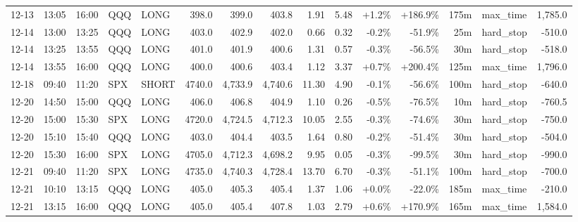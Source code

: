 \documentclass[11pt,a4paper,twoside]{article}
\begin{document}
\begin{landscape}
\begin{center}
\begin{longtable}{>{\color{txtmain}}l l l l l r r r r r r r r >{\color{txtmain}}l r}
12-13 & 13:05 & 16:00 & QQQ & LONG & 398.0 & 399.0 & 403.8 & 1.91 & 5.48 & \textcolor{wingreen}{+1.2\%} & \textcolor{wingreen}{+186.9\%} & 175m & max\_time & \textcolor{wingreen}{1,785.0} \\
12-14 & 13:00 & 13:25 & QQQ & LONG & 403.0 & 402.9 & 402.0 & 0.66 & 0.32 & \textcolor{lossred}{-0.2\%} & \textcolor{lossred}{-51.9\%} & 25m & hard\_stop & \textcolor{lossred}{-510.0} \\
12-14 & 13:25 & 13:55 & QQQ & LONG & 401.0 & 401.9 & 400.6 & 1.31 & 0.57 & \textcolor{lossred}{-0.3\%} & \textcolor{lossred}{-56.5\%} & 30m & hard\_stop & \textcolor{lossred}{-518.0} \\
12-14 & 13:55 & 16:00 & QQQ & LONG & 400.0 & 400.6 & 403.4 & 1.12 & 3.37 & \textcolor{wingreen}{+0.7\%} & \textcolor{wingreen}{+200.4\%} & 125m & max\_time & \textcolor{wingreen}{1,796.0} \\
12-18 & 09:40 & 11:20 & SPX & SHORT & 4740.0 & 4,733.9 & 4,740.6 & 11.30 & 4.90 & \textcolor{lossred}{-0.1\%} & \textcolor{lossred}{-56.6\%} & 100m & hard\_stop & \textcolor{lossred}{-640.0} \\
12-20 & 14:50 & 15:00 & QQQ & LONG & 406.0 & 406.8 & 404.9 & 1.10 & 0.26 & \textcolor{lossred}{-0.5\%} & \textcolor{lossred}{-76.5\%} & 10m & hard\_stop & \textcolor{lossred}{-760.5} \\
12-20 & 15:00 & 15:30 & SPX & LONG & 4720.0 & 4,724.5 & 4,712.3 & 10.05 & 2.55 & \textcolor{lossred}{-0.3\%} & \textcolor{lossred}{-74.6\%} & 30m & hard\_stop & \textcolor{lossred}{-750.0} \\
12-20 & 15:10 & 15:40 & QQQ & LONG & 403.0 & 404.4 & 403.5 & 1.64 & 0.80 & \textcolor{lossred}{-0.2\%} & \textcolor{lossred}{-51.4\%} & 30m & hard\_stop & \textcolor{lossred}{-504.0} \\
12-20 & 15:30 & 16:00 & SPX & LONG & 4705.0 & 4,712.3 & 4,698.2 & 9.95 & 0.05 & \textcolor{lossred}{-0.3\%} & \textcolor{lossred}{-99.5\%} & 30m & hard\_stop & \textcolor{lossred}{-990.0} \\
12-21 & 09:40 & 11:20 & SPX & LONG & 4735.0 & 4,740.3 & 4,728.4 & 13.70 & 6.70 & \textcolor{lossred}{-0.3\%} & \textcolor{lossred}{-51.1\%} & 100m & hard\_stop & \textcolor{lossred}{-700.0} \\
12-21 & 10:10 & 13:15 & QQQ & LONG & 405.0 & 405.3 & 405.4 & 1.37 & 1.06 & \textcolor{wingreen}{+0.0\%} & \textcolor{lossred}{-22.0\%} & 185m & max\_time & \textcolor{lossred}{-210.0} \\
12-21 & 13:15 & 16:00 & QQQ & LONG & 405.0 & 405.4 & 407.8 & 1.03 & 2.79 & \textcolor{wingreen}{+0.6\%} & \textcolor{wingreen}{+170.9\%} & 165m & max\_time & \textcolor{wingreen}{1,584.0} \\

\end{longtable}
\end{center}
\end{landscape}
\end{document}
